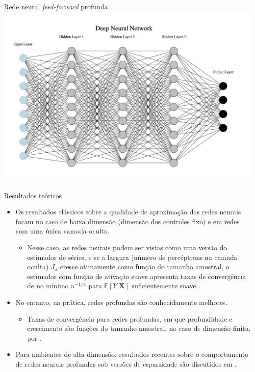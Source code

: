 \documentclass[11pt]{beamer}
\begin{document}
\begin{frame}{Rede neural  \textit{feed-forward}  profunda}
	\centering \includegraphics[scale=0.5]{graficos/deep_neural.png}

\end{frame}

\begin{frame}{Resultados teóricos}
\begin{itemize}
	\item Os resultados clássicos sobre a qualidade de aproximação das redes neurais focam no caso de baixa dimensão (dimensão dos controles fixo) e em redes com uma única camada oculta.
	\begin{itemize}
		\item Nesse caso, as redes neurais podem ser vistas como uma versão do estimador de séries, e se a largura (número de percéptrons na camada oculta) $J_n$ cresce otimamente como função do tamanho amostral, o estimador com função de ativação suave apresenta taxas de convergência de no mínimo $n^{-1/4}$ para $\mathbb{E}[Y|\boldsymbol{X}]$ suficientemente suave \citep{Chen1999,chen2007}.
	\end{itemize}
	\item No entanto, na prática, redes profundas são conhecidamente melhores.
	\begin{itemize}
		\item Taxas de convergência para redes profundas, em que profundidade e crescimento são funções do tamanho amostral, no caso de dimensão finita, por \citep{Farrell2021}.
	\end{itemize}
	\item Para ambientes de alta dimensão, resultados recentes sobre o comportamento de redes neurais profundas sob versões de esparsidade são discutidos em \cite{chernozhukov2024appliedcausalinferencepowered}.
\end{itemize}
\end{frame}
\end{document}
